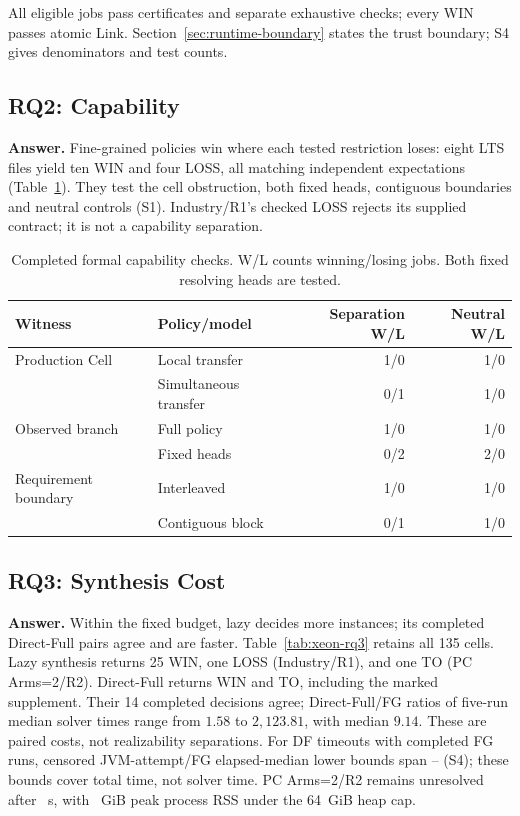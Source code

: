 \documentclass[acmsmall,screen,review,anonymous]{acmart}
\begin{document}
All eligible jobs pass certificates and separate exhaustive checks; every WIN passes atomic Link. Section~\ref{sec:runtime-boundary} states the trust boundary; S4 gives denominators and test counts.

\subsection{RQ2: Capability}
\textbf{Answer.} Fine-grained policies win where each tested restriction loses: eight LTS files yield ten WIN and four LOSS, all matching independent expectations (Table~\ref{tab:capability-revalidated}). They test the cell obstruction, both fixed heads, contiguous boundaries and neutral controls (S1). Industry/R1's checked LOSS rejects its supplied contract; it is not a capability separation.

\begin{table}[!htbp]
\caption{Completed formal capability checks. W/L counts winning/losing jobs. Both fixed resolving heads are tested.}
\label{tab:capability-revalidated}
\centering\small
\begin{tabular}{@{}llrr@{}}
\toprule
Witness & Policy/model & Separation W/L & Neutral W/L\\
\midrule
Production Cell & Local transfer & 1/0 & 1/0\\
 & Simultaneous transfer & 0/1 & 1/0\\
Observed branch & Full policy & 1/0 & 1/0\\
 & Fixed heads & 0/2 & 2/0\\
Requirement boundary & Interleaved & 1/0 & 1/0\\
 & Contiguous block & 0/1 & 1/0\\
\bottomrule
\end{tabular}
\end{table}

\subsection{RQ3: Synthesis Cost}
\textbf{Answer.} Within the fixed budget, lazy decides more instances; its completed Direct-Full pairs agree and are faster. Table~\ref{tab:xeon-rq3} retains all 135 cells. Lazy synthesis returns 25 WIN, one LOSS (Industry/R1), and one TO (PC Arms=2/R2). Direct-Full returns \ADDirectFullWins{} WIN and \ADDirectFullTimeouts{} TO, including the marked supplement. Their 14 completed decisions agree; Direct-Full/FG ratios of five-run median solver times range from $1.58$ to $2{,}123.81$, with median $9.14$. These are paired costs, not realizability separations. For \CensoredPairs{} DF timeouts with completed FG runs, censored JVM-attempt/FG elapsed-median lower bounds span \CensoredBoundMin--\CensoredBoundMax{} (S4); these bounds cover total time, not solver time. PC Arms=2/R2 remains unresolved after \ADPCCapSeconds{}~s, with \ADPCPeakRSSGiB{}~GiB peak process RSS under the 64~GiB heap cap.
\end{document}

